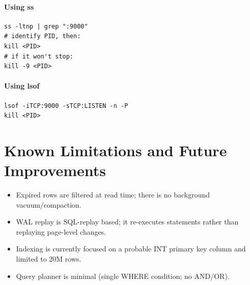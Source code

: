 \documentclass[11pt]{article}
\begin{document}
\paragraph{Using ss}
\begin{lstlisting}[basicstyle=\ttfamily\small]
ss -ltnp | grep ":9000"
# identify PID, then:
kill <PID>
# if it won't stop:
kill -9 <PID>
\end{lstlisting}

\paragraph{Using lsof}
\begin{lstlisting}[basicstyle=\ttfamily\small]
lsof -iTCP:9000 -sTCP:LISTEN -n -P
kill <PID>
\end{lstlisting}

\section{Known Limitations and Future Improvements}
\begin{itemize}[leftmargin=*]
\item Expired rows are filtered at read time; there is no background vacuum/compaction.
\item WAL replay is SQL-replay based; it re-executes statements rather than replaying page-level changes.
\item Indexing is currently focused on a probable INT primary key column and limited to 20M rows.
\item Query planner is minimal (single WHERE condition; no AND/OR).
\end{itemize}
\end{document}
